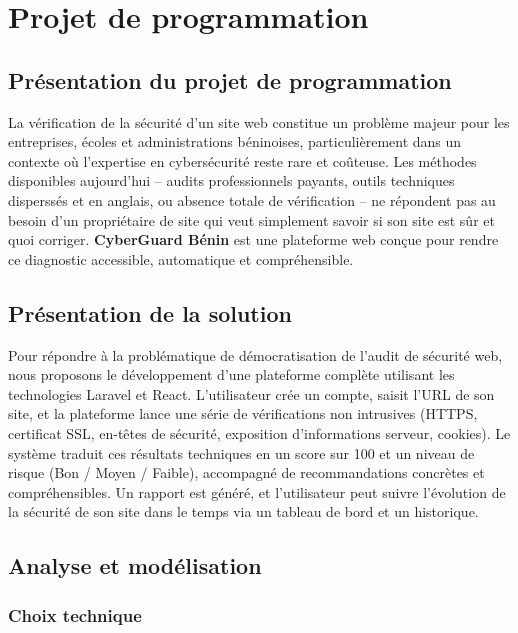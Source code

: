\chapter{Projet de programmation}
\label{chap:programmation}

\section{Pr\'esentation du projet de programmation}

La v\'erification de la s\'ecurit\'e d'un site web constitue un probl\`eme majeur pour
les entreprises, \'ecoles et administrations b\'eninoises, particuli\`erement dans un
contexte o\`u l'expertise en cybers\'ecurit\'e reste rare et co\^uteuse. Les m\'ethodes
disponibles aujourd'hui -- audits professionnels payants, outils techniques
disperss\'es et en anglais, ou absence totale de v\'erification -- ne r\'epondent pas
au besoin d'un propri\'etaire de site qui veut simplement savoir si son site est
s\^ur et quoi corriger. \textbf{CyberGuard B\'enin} est une plateforme web con\c{c}ue
pour rendre ce diagnostic accessible, automatique et compr\'ehensible.

\section{Pr\'esentation de la solution}

Pour r\'epondre \`a la probl\'ematique de d\'emocratisation de l'audit de s\'ecurit\'e web,
nous proposons le d\'eveloppement d'une plateforme compl\`ete utilisant les
technologies Laravel et React. L'utilisateur cr\'ee un compte, saisit l'URL de son
site, et la plateforme lance une s\'erie de v\'erifications non intrusives (HTTPS,
certificat SSL, en-t\^etes de s\'ecurit\'e, exposition d'informations serveur,
cookies). Le syst\`eme traduit ces r\'esultats techniques en un score sur 100 et un
niveau de risque (Bon / Moyen / Faible), accompagn\'e de recommandations concr\`etes
et compr\'ehensibles. Un rapport est g\'en\'er\'e, et l'utilisateur peut suivre
l'\'evolution de la s\'ecurit\'e de son site dans le temps via un tableau de bord et
un historique.

\section{Analyse et mod\'elisation}

\subsection{Choix technique}

